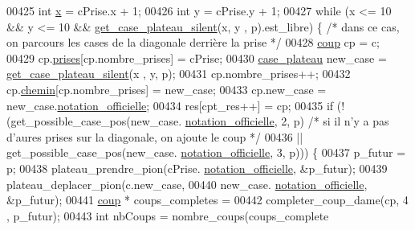 \begin{DoxyCode}
00425                         \textcolor{keywordtype}{int} \hyperlink{plateau_8h_a9e00f85b4b6ec2d8bdfbe94ff40f0eeeacab1e15e82c5976bfb476ddfe145263c}{x} = cPrise.x + 1;
00426                         \textcolor{keywordtype}{int} y = cPrise.y + 1;
00427                         \textcolor{keywordflow}{while} (x <= 10 && y <= 10 && \hyperlink{plateau_8h_a60a8f706865d0ae9087f8d65d4667655}{get_case_plateau_silent}(x, y
      , p).est\_libre) \{ \textcolor{comment}{/* dans ce cas, on parcours les cases de la diagonale derrière 
      la prise */}
00428                                 \hyperlink{structcoup}{coup} cp = c;
00429                                 cp.\hyperlink{structcoup_ae19b3a66d3f4e66b8f69a38e4005f44a}{prises}[cp.nombre\_prises] = cPrise;
00430                                 \hyperlink{structcase__plateau}{case_plateau} new\_case = \hyperlink{plateau_8h_a60a8f706865d0ae9087f8d65d4667655}{get_case_plateau_silent}(x
      , y, p);
00431                                 cp.nombre\_prises++;
00432                                 cp.\hyperlink{structcoup_aa66b88eb8140c2f459ac92fad0796510}{chemin}[cp.nombre\_prises] = new\_case;
00433                                 cp.new\_case = new\_case.\hyperlink{structcase__plateau_ad510581b324604a9cf685cbb769a421a}{notation_officielle};
00434                                 res[cpt\_res++] = cp;
00435                                 \textcolor{keywordflow}{if} (!(get\_possible\_case\_pos(new\_case.
      \hyperlink{structcase__plateau_ad510581b324604a9cf685cbb769a421a}{notation_officielle}, 2, p) \textcolor{comment}{/* si il n'y a pas d'aures prises sur la diagonale, on
       ajoute le coup */}
00436                                 || get\_possible\_case\_pos(new\_case.
      \hyperlink{structcase__plateau_ad510581b324604a9cf685cbb769a421a}{notation_officielle}, 3, p))) \{
00437                                         p\_futur = p;
00438                                         plateau\_prendre\_pion(cPrise.
      \hyperlink{structcase__plateau_ad510581b324604a9cf685cbb769a421a}{notation_officielle}, &p\_futur);
00439                                         plateau\_deplacer\_pion(c.new\_case,
00440                                                         new\_case.
      \hyperlink{structcase__plateau_ad510581b324604a9cf685cbb769a421a}{notation_officielle}, &p\_futur);
00441                                         \hyperlink{structcoup}{coup} * coups\_completes =
00442                                                         completer\_coup\_dame(cp, 4
      , p\_futur);
00443                                         \textcolor{keywordtype}{int} nbCoups = nombre\_coups(coups\_complete

\end{DoxyCode}
